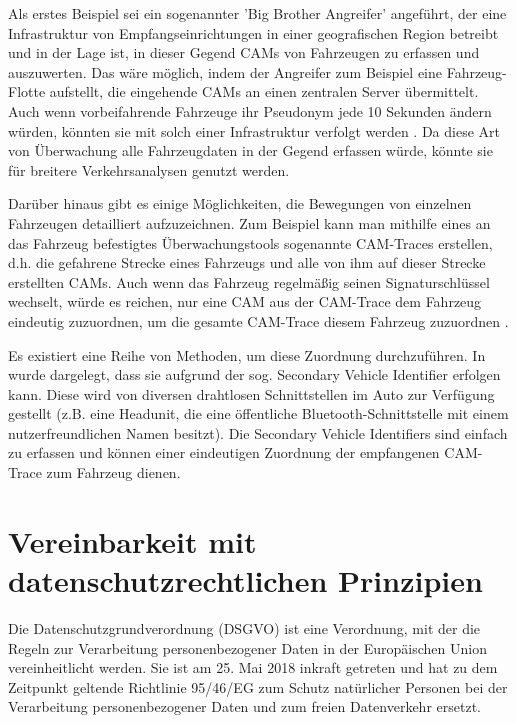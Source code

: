 Als erstes Beispiel sei ein sogenannter 'Big Brother Angreifer' angeführt, der eine Infrastruktur von Empfangseinrichtungen in einer geografischen Region betreibt und in der Lage ist, in dieser Gegend CAMs von Fahrzeugen zu erfassen und auszuwerten. Das wäre möglich, indem der Angreifer zum Beispiel eine Fahrzeug-Flotte aufstellt, die eingehende CAMs an einen zentralen Server übermittelt. Auch wenn vorbeifahrende Fahrzeuge ihr Pseudonym jede 10 Sekunden ändern würden, könnten sie mit solch einer Infrastruktur verfolgt werden \cite{Wiedersheim2010}. Da diese Art von Überwachung alle Fahrzeugdaten in der Gegend erfassen würde, könnte sie für breitere Verkehrsanalysen genutzt werden.
 
Darüber hinaus gibt es einige Möglichkeiten, die Bewegungen von einzelnen Fahrzeugen detailliert aufzuzeichnen. Zum Beispiel kann man mithilfe eines an das Fahrzeug befestigtes Überwachungstools sogenannte CAM-Traces erstellen, d.h. die gefahrene Strecke eines Fahrzeugs und alle von ihm auf dieser Strecke erstellten CAMs. Auch wenn das Fahrzeug regelmäßig seinen Signaturschlüssel wechselt, würde es reichen, nur eine CAM aus der CAM-Trace dem Fahrzeug eindeutig zuzuordnen, um die gesamte CAM-Trace diesem Fahrzeug zuzuordnen \cite{Kiometzis2017}. 

Es existiert eine Reihe von Methoden, um diese Zuordnung durchzuführen. In \cite{Ullmann2016} wurde dargelegt, dass sie aufgrund der sog. Secondary Vehicle Identifier erfolgen kann. Diese wird von diversen drahtlosen Schnittstellen im Auto zur Verfügung gestellt (z.B. eine Headunit, die eine öffentliche Bluetooth-Schnittstelle mit einem nutzerfreundlichen Namen besitzt). Die Secondary Vehicle Identifiers sind einfach zu erfassen und können einer eindeutigen Zuordnung der empfangenen CAM-Trace zum Fahrzeug dienen. 





\section{Vereinbarkeit mit datenschutzrechtlichen Prinzipien}
\label{ch:SecondContentSection}

Die Datenschutzgrundverordnung (DSGVO) ist eine Verordnung, mit der die Regeln zur Verarbeitung personenbezogener Daten in der Europäischen Union vereinheitlicht werden. Sie ist am 25. Mai 2018 inkraft getreten und hat zu dem Zeitpunkt geltende Richtlinie 95/46/EG zum Schutz natürlicher Personen bei der Verarbeitung personenbezogener Daten und zum freien Datenverkehr ersetzt. 

